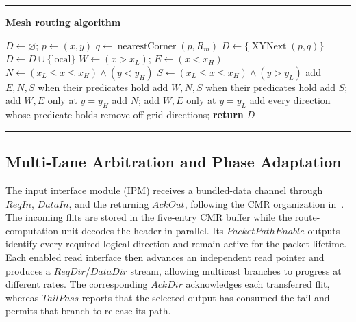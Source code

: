 \documentclass[conference]{IEEEtran}
\begin{document}
\begin{center}
\begin{minipage}{0.96\columnwidth}
\hrule\vspace{2pt}
\scriptsize\textbf{Mesh routing algorithm}\vspace{-2pt}
\begin{algorithmic}[1]
\STATE $D\gets\varnothing$; $p\gets(x,y)$
  \STATE $q\gets\operatorname{nearestCorner}(p,R_m)$
  \STATE $D\gets\{\operatorname{XYNext}(p,q)\}$
\ELSE
   \STATE $D\gets D\cup\{\mathrm{local}\}$ \ENDIF
  \STATE $W\gets(x>x_L)$; $E\gets(x<x_H)$
  \STATE $N\gets(x_L\leq x\leq x_H)\land(y<y_H)$
  \STATE $S\gets(x_L\leq x\leq x_H)\land(y>y_L)$
   \STATE add $E,N,S$ when their predicates hold
   \STATE add $W,N,S$ when their predicates hold
   \STATE add $S$; add $W,E$ only at $y=y_H$
   \STATE add $N$; add $W,E$ only at $y=y_L$
  \ELSE \STATE add every direction whose predicate holds
  \ENDIF
\ENDIF
\STATE remove off-grid directions; \textbf{return} $D$
\end{algorithmic}
\vspace{2pt}\hrule
\end{minipage}
\end{center}

\subsection{Multi-Lane Arbitration and Phase Adaptation}\label{sec:multilane}

\begingroup
\setlength{\parskip}{0pt}
\setlength{\emergencystretch}{1.5em}

The input interface module (IPM) receives a bundled-data channel through
\(ReqIn\), \(DataIn\), and the returning \(AckOut\), following the CMR
organization in~\cite{bhardwaj2019cmr}. The incoming flits are stored in
the five-entry CMR buffer while the route-computation unit decodes the
header in parallel. Its \(PacketPathEnable\) outputs identify every
required logical direction and remain active for the packet lifetime.
Each enabled read interface then advances an independent read pointer and
produces a \(ReqDir\)/\(DataDir\) stream, allowing multicast branches to
progress at different rates. The corresponding \(AckDir\) acknowledges
each transferred flit, whereas \(TailPass\) reports that the selected
output has consumed the tail and permits that branch to release its path.
\end{document}
